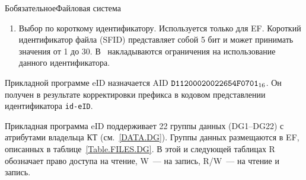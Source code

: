 \begin{appendix}{Б}{обязательное}{Файловая система}
\begin{enumerate}
\item
Выбор по короткому идентификатору. Используется только для EF. Короткий
идентификатор файла (SFID) представляет собой 5 бит и может принимать значения
от 1 до 30. В~\cite{APDU} накладываются ограничения на использование данного
идентификатора.
\end{enumerate}


Прикладной программе eID назначается AID $\texttt{D11200020022654F0701}_{16}$. 
Он получен в результате корректировки префикса в кодовом представлении 
идентификатора \verb|id-eID|.
%

Прикладная программа eID поддерживает 22 группы 
данных (DG1--DG22) с атрибутами владельца КТ (см.~\ref{DATA.DG}). 
%
Группы данных размещаются в EF, описанных в таблице~\ref{Table.FILES.DG}. 
%
В этой и следующей таблицах R обозначает право доступа на чтение, 
W~--- на запись, R/W~--- на чтение и запись.
 

\end{appendix}
